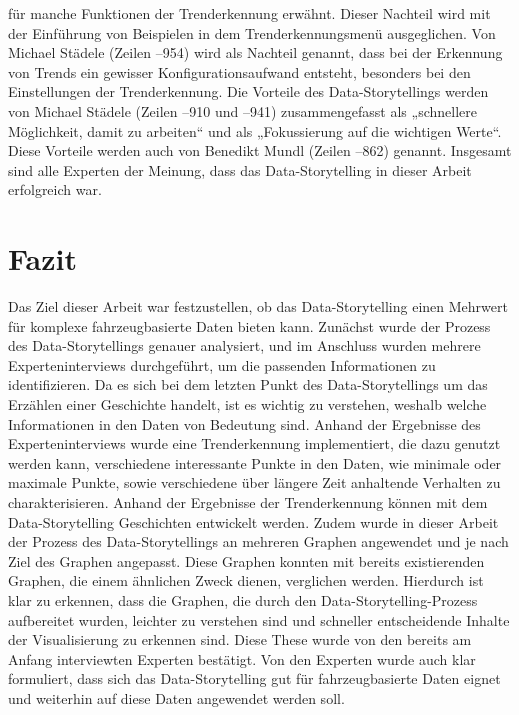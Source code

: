 für manche Funktionen der Trenderkennung erwähnt. Dieser Nachteil wird mit der Einführung von Beispielen in dem Trenderkennungsmenü ausgeglichen. Von Michael Städele (Zeilen --954) wird als Nachteil genannt, dass bei der Erkennung von Trends ein gewisser Konfigurationsaufwand entsteht, besonders bei den Einstellungen der Trenderkennung. Die Vorteile des Data-Storytellings werden von Michael Städele (Zeilen --910 und --941) zusammengefasst als „schnellere Möglichkeit, damit zu arbeiten“ und als „Fokussierung auf die wichtigen Werte“. Diese Vorteile werden auch von Benedikt Mundl (Zeilen --862) genannt. Insgesamt sind alle Experten der Meinung, dass das Data-Storytelling in dieser Arbeit erfolgreich war.
\section{Fazit}
Das Ziel dieser Arbeit war festzustellen, ob das Data-Storytelling einen Mehrwert für komplexe fahrzeugbasierte Daten bieten kann.
Zunächst wurde der Prozess des Data-Storytellings genauer analysiert, und im Anschluss wurden mehrere Experteninterviews durchgeführt, um die passenden Informationen zu identifizieren. Da es sich bei dem letzten Punkt des Data-Storytellings um das Erzählen einer Geschichte handelt, ist es wichtig zu verstehen, weshalb welche Informationen in den Daten von Bedeutung sind. Anhand der Ergebnisse des Experteninterviews wurde eine Trenderkennung implementiert, die dazu genutzt werden kann, verschiedene interessante Punkte in den Daten, wie minimale oder maximale Punkte, sowie verschiedene über längere Zeit anhaltende Verhalten zu charakterisieren. Anhand der Ergebnisse der Trenderkennung können mit dem Data-Storytelling Geschichten entwickelt werden. Zudem wurde in dieser Arbeit der Prozess des Data-Storytellings an mehreren Graphen angewendet und je nach Ziel des Graphen angepasst. Diese Graphen konnten mit bereits existierenden Graphen, die einem ähnlichen Zweck dienen, verglichen werden. Hierdurch ist klar zu erkennen, dass die Graphen, die durch den Data-Storytelling-Prozess aufbereitet wurden, leichter zu verstehen sind und schneller entscheidende Inhalte der Visualisierung zu erkennen sind. Diese These wurde von den bereits am Anfang interviewten Experten bestätigt. Von den Experten wurde auch klar formuliert, dass sich das Data-Storytelling gut für fahrzeugbasierte Daten eignet und weiterhin auf diese Daten angewendet werden soll.
